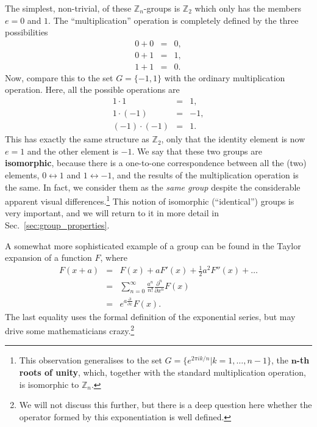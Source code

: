 \documentclass[notes.tex]{subfiles}
\begin{document}
The simplest, non-trivial, of these $\mathbb{Z}_n$-groups is $\mathbb{Z}_2$ which only has the members $e=0$ and $1$. The ``multiplication'' operation is completely defined by the three possibilities
\begin{eqnarray*}
0+0 &=&0, \\ 0+1 &=& 1, \\ 1+1 &=&0.
\end{eqnarray*}
Now, compare this to the set $G=\{-1,1\}$ with the ordinary multiplication operation. Here, all the possible operations are 
\begin{eqnarray*}
1\cdot 1 &=& 1,\\  1\cdot (-1) &=&-1,\\ (-1)\cdot (-1) &=&1.
\end{eqnarray*}
This has exactly the same structure as $\mathbb{Z}_2$, only that the identity element is now $e=1$ and the other element is $-1$.  We say that these two groups are {\bf isomorphic}, because there is a one-to-one correspondence between all the (two) elements, $0\leftrightarrow 1$ and $1\leftrightarrow -1$, and the results of the multiplication operation is the same. In fact, we consider them as the {\it same group} despite the considerable apparent visual differences.\footnote{This observation  generalises to the set $G=\{e^{2\pi ik/n} | k=1,\ldots,n-1\}$, the {\bf $\mathbf n$-th roots of unity}, which, together with the standard multiplication operation, is isomorphic to  $\mathbb{Z}_n$.} 
This notion of isomorphic (``identical'') groups is very important, and we will return to it in more detail in Sec.~\ref{sec:group_properties}.

A somewhat more sophisticated example of a group can be found in the Taylor expansion of a function $F$, where
\begin{eqnarray*}
F(x+a) &=& F(x) + aF'(x) + \frac{1}{2} a^2 F''(x) + \ldots \\
&=& \sum_{n=0}^{\infty}\frac{a^n}{n!}\frac{\partial^n}{\partial x^n} F(x)\\
&=& e^{a\frac{\partial}{\partial x}} F(x).
\end{eqnarray*}
The last equality uses the formal definition of the exponential series, but may drive some mathematicians crazy.\footnote{We will not discuss this further, but there is a deep question here whether the operator formed by this exponentiation is well defined.}  
\end{document}
